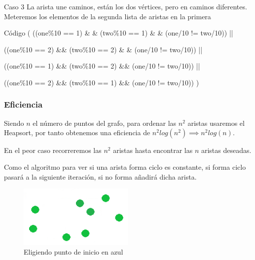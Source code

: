 \begin{frame}
	\begin{block}{Caso 3}
	La arista une caminos, están los dos vértices, pero en caminos diferentes.
	Meteremos los elementos de la segunda lista de aristas en la primera
	\end{block}
	
	\begin{exampleblock}{Código}            
	\hspace{1cm}( ((one\%10 == 1) \& \& (two\%10 == 1) \& \& (one/10 != two/10)) ||
	               
	\hspace{1cm}((one\%10 == 2) \&\& (two\%10 == 2) \& \& (one/10 != two/10)) ||

	\hspace{1cm}((one\%10 == 1) \&\& (two\%10 == 2) \&\& (one/10 != two/10)) ||

	\hspace{1cm}((one\%10 == 2) \&\& (two\%10 == 1) \&\& (one/10 != two/10)) )
	\end{exampleblock}
\end{frame}
           

\subsubsection{Eficiencia}
\begin{frame}
	\begin{block}{ }
	Siendo $n$ el número de puntos del grafo, para ordenar las $n^2$ aristas usaremos el 	
	Heapsort, por tanto obtenemos una eficiencia de $n^2log(n^2) \implies n^2log(n)$.
	\end{block}
	
	\begin{block}{ }
	En el peor caso recorreremos las $n^2$ aristas hasta encontrar las $n$ aristas  	
	deseadas.

	Como el algoritmo para ver si una arista forma ciclo es constante, si forma ciclo 
	pasará a la siguiente iteración, si no forma añadirá dicha arista.
	\end{block}
\end{frame}

\begin{frame}
	\begin{exampleblock}{ }
	\begin{figure}[htbH] 
		\centering
		\includegraphics[width=0.5\textwidth]{./Imagenes/arista1.png}
		\caption{Eligiendo punto de inicio en azul} 
	\end{figure}
	\end{exampleblock}
\end{frame}

